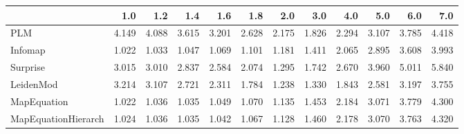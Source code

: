 \begin{tabular}{lrrrrrrrrrrr}
\toprule
{} &   1.0 &   1.2 &   1.4 &   1.6 &   1.8 &   2.0 &   3.0 &   4.0 &   5.0 &   6.0 &   7.0 \\
\midrule
PLM                 & 4.149 & 4.088 & 3.615 & 3.201 & 2.628 & 2.175 & 1.826 & 2.294 & 3.107 & 3.785 & 4.418 \\
Infomap             & 1.022 & 1.033 & 1.047 & 1.069 & 1.101 & 1.181 & 1.411 & 2.065 & 2.895 & 3.608 & 3.993 \\
Surprise            & 3.015 & 3.010 & 2.837 & 2.584 & 2.074 & 1.295 & 1.742 & 2.670 & 3.960 & 5.011 & 5.840 \\
LeidenMod           & 3.214 & 3.107 & 2.721 & 2.311 & 1.784 & 1.238 & 1.330 & 1.843 & 2.581 & 3.197 & 3.755 \\
MapEquation         & 1.022 & 1.036 & 1.035 & 1.049 & 1.070 & 1.135 & 1.453 & 2.184 & 3.071 & 3.779 & 4.300 \\
MapEquationHierarch & 1.024 & 1.036 & 1.035 & 1.042 & 1.067 & 1.128 & 1.460 & 2.178 & 3.070 & 3.763 & 4.320 \\
\bottomrule
\end{tabular}
